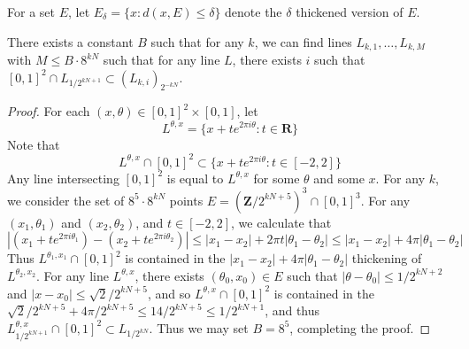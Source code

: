 For a set $E$, let $E_\delta = \{ x: d(x,E) \leq \delta \}$ denote the $\delta$ thickened version of $E$.

\begin{lemma} \label{lineCounting}
	There exists a constant $B$ such that for any $k$, we can find lines $L_{k,1}, \dots, L_{k,M}$ with $M \leq B \cdot 8^{kN}$ such that for any line $L$, there exists $i$ such that $[0,1]^2 \cap L_{1/2^{kN+1}} \subset (L_{k,i})_{2^{-kN}}$.
\end{lemma}
\begin{proof}
	For each $(x,\theta) \in [0,1]^2 \times [0,1]$, let
	\[ L^{\theta,x} = \{ x + t e^{2 \pi i \theta} : t \in \mathbf{R} \} \]
	Note that
	\[ L^{\theta,x} \cap [0,1]^2 \subset \{ x + t e^{2 \pi i \theta} : t \in [-2,2] \} \]
	Any line intersecting $[0,1]^2$ is equal to $L^{\theta,x}$ for some $\theta$ and some $x$. For any $k$, we consider the set of $8^5 \cdot 8^{kN}$ points $E = (\mathbf{Z}/2^{kN+5})^3 \cap [0,1]^3$. For any $(x_1,\theta_1)$ and $(x_2,\theta_2)$, and $t \in [-2,2]$, we calculate that
	\[ |(x_1 + t e^{2 \pi i \theta_1}) - (x_2 + te^{2 \pi i \theta_2})| \leq |x_1 - x_2| + 2 \pi t |\theta_1 - \theta_2| \leq |x_1 - x_2| + 4 \pi |\theta_1 - \theta_2| \]
	Thus $L^{\theta_1,x_1} \cap [0,1]^2$ is contained in the $|x_1 - x_2| + 4 \pi |\theta_1 - \theta_2|$ thickening of $L^{\theta_2,x_2}$. For any line $L^{\theta,x}$, there exists $(\theta_0,x_0) \in E$ such that $|\theta - \theta_0| \leq 1/2^{kN+2}$ and $|x - x_0| \leq \sqrt{2}/2^{kN+5}$, and so $L^{\theta,x} \cap [0,1]^2$ is contained in the $\sqrt{2}/2^{kN+5} + 4\pi/2^{kN+5} \leq 14/2^{kN+5} \leq 1/2^{kN+1}$, and thus $L^{\theta,x}_{1/2^{kN+1}} \cap [0,1]^2 \subset L_{1/2^{kN}}$. Thus we may set $B = 8^5$, completing the proof.
\end{proof}

